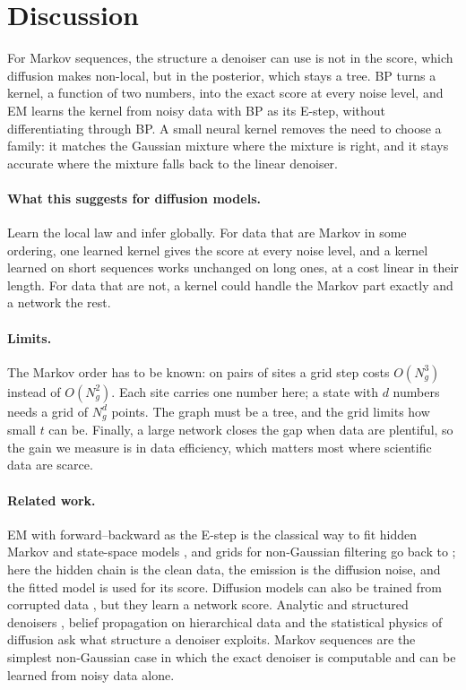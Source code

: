 \section{Discussion}
\label{sec:discussion}

For Markov sequences, the structure a denoiser can use is not in the score, which diffusion makes non-local, but in the
posterior, which stays a tree. BP turns a kernel, a function of two numbers, into the exact score at every noise level,
and EM learns the kernel from noisy data with BP as its E-step, without differentiating through BP. A small neural
kernel removes the need to choose a family: it matches the Gaussian mixture where the mixture is right, and it stays
accurate where the mixture falls back to the linear denoiser.

\paragraph{What this suggests for diffusion models.} Learn the local law and infer globally. For data that are Markov
in some ordering, one learned kernel gives the score at every noise level, and a kernel learned on short sequences works
unchanged on long ones, at a cost linear in their length. For data that are not, a kernel could handle the Markov part
exactly and a network the rest.

\paragraph{Limits.} The Markov order has to be known: on pairs of sites a grid step costs $O(N_g^3)$ instead of
$O(N_g^2)$. Each site carries one number here; a state with $d$ numbers needs a grid of $N_g^d$ points. The graph must be
a tree, and the grid limits how small $t$ can be. Finally, a large network closes the gap when data are plentiful, so the
gain we measure is in data efficiency, which matters most where scientific data are scarce.

\paragraph{Related work.} EM with forward--backward as the E-step is the classical way to fit hidden Markov and
state-space models \cite{baum1970,rabiner1989tutorial,shumway1982em,cappe2005}, and grids for non-Gaussian filtering go
back to \cite{kitagawa1987}; here the hidden chain is the clean data, the emission is the diffusion noise, and the
fitted model is used for its score. Diffusion models can also be trained from corrupted data
\cite{daras2023ambient,rozet2024learning,bai2024em}, but they learn a network score. Analytic and structured denoisers
\cite{kamb2024analytic,kadkhodaie2024generalization}, belief propagation on hierarchical data
\cite{garnierbrun2024transformers,sclocchi2025phase,mei2024unets} and the statistical physics of diffusion
\cite{biroli2023generative,biroli2024dynamical,achilli2025memorization,bonnaire2025memorize,garnierbrun2026biased}
ask what structure a denoiser exploits. Markov sequences are the simplest non-Gaussian case in which the exact denoiser
is computable and can be learned from noisy data alone.
